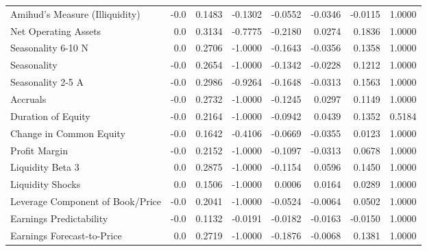 \begin{tabular}{lrrrrrrr}
Amihud's Measure (Illiquidity)             &  -0.0 &  0.1483 & -0.1302 & -0.0552 & -0.0346 & -0.0115 &  1.0000 \\
Net Operating Assets                       &   0.0 &  0.3134 & -0.7775 & -0.2180 &  0.0274 &  0.1836 &  1.0000 \\
Seasonality 6-10 N                         &   0.0 &  0.2706 & -1.0000 & -0.1643 & -0.0356 &  0.1358 &  1.0000 \\
Seasonality                                &  -0.0 &  0.2654 & -1.0000 & -0.1342 & -0.0228 &  0.1212 &  1.0000 \\
Seasonality 2-5 A                          &  -0.0 &  0.2986 & -0.9264 & -0.1648 & -0.0313 &  0.1563 &  1.0000 \\
Accruals                                   &  -0.0 &  0.2732 & -1.0000 & -0.1245 &  0.0297 &  0.1149 &  1.0000 \\
Duration of Equity                         &  -0.0 &  0.2164 & -1.0000 & -0.0942 &  0.0439 &  0.1352 &  0.5184 \\
Change in Common Equity                    &  -0.0 &  0.1642 & -0.4106 & -0.0669 & -0.0355 &  0.0123 &  1.0000 \\
Profit Margin                              &  -0.0 &  0.2152 & -1.0000 & -0.1097 & -0.0313 &  0.0678 &  1.0000 \\
Liquidity Beta 3                           &   0.0 &  0.2875 & -1.0000 & -0.1154 &  0.0596 &  0.1450 &  1.0000 \\
Liquidity Shocks                           &   0.0 &  0.1506 & -1.0000 &  0.0006 &  0.0164 &  0.0289 &  1.0000 \\
Leverage Component of Book/Price           &  -0.0 &  0.2041 & -1.0000 & -0.0524 & -0.0064 &  0.0502 &  1.0000 \\
Earnings Predictability                    &  -0.0 &  0.1132 & -0.0191 & -0.0182 & -0.0163 & -0.0150 &  1.0000 \\
Earnings Forecast-to-Price                 &   0.0 &  0.2719 & -1.0000 & -0.1876 & -0.0068 &  0.1381 &  1.0000 \\
\bottomrule
\end{tabular}
